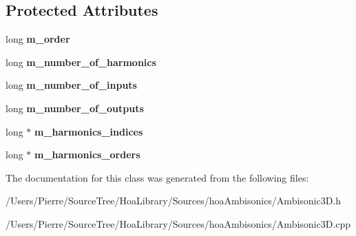 \subsection*{Protected Attributes}
\begin{DoxyCompactItemize}
\item 
\hypertarget{class_ambisonic3_d_a3ea989a3583e2972139a363564711e2b}{long {\bfseries m\-\_\-order}}\label{class_ambisonic3_d_a3ea989a3583e2972139a363564711e2b}

\item 
\hypertarget{class_ambisonic3_d_aceadaee86c8d9ad770bbe00829e65804}{long {\bfseries m\-\_\-number\-\_\-of\-\_\-harmonics}}\label{class_ambisonic3_d_aceadaee86c8d9ad770bbe00829e65804}

\item 
\hypertarget{class_ambisonic3_d_ace03a703aad689dc3d48e95a9e4f4d06}{long {\bfseries m\-\_\-number\-\_\-of\-\_\-inputs}}\label{class_ambisonic3_d_ace03a703aad689dc3d48e95a9e4f4d06}

\item 
\hypertarget{class_ambisonic3_d_ad650b4479aa106e0914b5aa3634249a0}{long {\bfseries m\-\_\-number\-\_\-of\-\_\-outputs}}\label{class_ambisonic3_d_ad650b4479aa106e0914b5aa3634249a0}

\item 
\hypertarget{class_ambisonic3_d_a6956fcba4f28ef36e487ab84a003ab27}{long $\ast$ {\bfseries m\-\_\-harmonics\-\_\-indices}}\label{class_ambisonic3_d_a6956fcba4f28ef36e487ab84a003ab27}

\item 
\hypertarget{class_ambisonic3_d_a5da35d2fac8aee501c51fd57ec66b565}{long $\ast$ {\bfseries m\-\_\-harmonics\-\_\-orders}}\label{class_ambisonic3_d_a5da35d2fac8aee501c51fd57ec66b565}

\end{DoxyCompactItemize}


The documentation for this class was generated from the following files\-:\begin{DoxyCompactItemize}
\item 
/\-Users/\-Pierre/\-Source\-Tree/\-Hoa\-Library/\-Sources/hoa\-Ambisonics/Ambisonic3\-D.\-h\item 
/\-Users/\-Pierre/\-Source\-Tree/\-Hoa\-Library/\-Sources/hoa\-Ambisonics/Ambisonic3\-D.\-cpp\end{DoxyCompactItemize}
